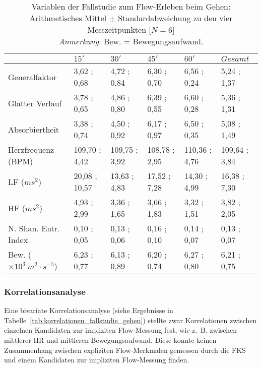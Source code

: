 \begin{sidewaystable}
\centering
	\caption[Variablen zu den vier Messzeitpunkten (Fallstudie: Gehen)]{Variablen der Fallstudie zum Flow-Erleben beim Gehen: Arithmetisches Mittel $\pm$ Standardabweichung zu den vier Messzeitpunkten [$N = 6$] \\ \hspace{\textwidth}\emph{Anmerkung}: Bew. = Bewegungsaufwand.}	
	\label{tab:variablen_nach_messzeitpunkt_fallstudie_gehen}
	\begin{tabular}{lyyyyy}
\toprule
& $15'$ & $30'$ & $45'$ & $60'$ & $Gesamt$ \\
\midrule
Generalfaktor & 3{,}62 ; 0{,}68 & 4{,}72 ; 0{,}84 & 6{,}30 ; 0{,}70 & 6{,}56 ; 0{,}24 & 5{,}24 ; 1{,}37 \\
Glatter Verlauf & 3{,}78 ; 0{,}65 & 4{,}86 ; 0{,}80 & 6{,}39 ; 0{,}55 & 6{,}60 ; 0{,}28 & 5{,}36 ; 1{,}31 \\
Absorbiertheit & 3{,}38 ; 0{,}74 & 4{,}50 ; 0{,}92 & 6{,}17 ; 0{,}97 & 6{,}50 ; 0{,}35 & 5{,}08 ; 1{,}49 \\
Herzfrequenz (BPM) & 109{,}70 ; 4{,}42 & 109{,}75 ; 3{,}92 & 108{,}78 ; 2{,}95 & 110{,}36 ; 4{,}76 & 109{,}64 ; 3{,}84 \\
LF ($ms^2$) & 20{,}08 ; 10{,}57 & 13{,}63 ; 4{,}83 & 17{,}52 ; 7{,}28 & 14{,}30 ; 4{,}99 & 16{,}38 ; 7{,}30 \\
HF ($ms^2$) & 4{,}93 ; 2{,}99 & 3{,}36 ; 1{,}65 & 3{,}66 ; 1{,}83 & 3{,}32 ; 1{,}51 & 3{,}82 ; 2{,}05 \\
N. Shan. Entr. Index & 0{,}10 ; 0{,}05 & 0{,}13 ; 0{,}06 & 0{,}16 ; 0{,}10 & 0{,}14 ; 0{,}07 & 0{,}13 ; 0{,}07 \\
Bew. ($\times 10^3 \: m^2 \cdot s^{-5}$) & 6{,}23 ; 0{,}77 & 6{,}13 ; 0{,}89 & 6{,}20 ; 0{,}74 & 6{,}27 ; 0{,}80 & 6{,}21 ; 0{,}75 \\
\bottomrule
\end{tabular}
\end{sidewaystable}

\subsubsection{Korrelationsanalyse}
\label{subs:korrelationsanalyse_1}
Eine bivariate Korrelationsanalyse (siehe Ergebnisse in Tabelle~\ref{tab:korrelationen_fallstudie_gehen}) stellte zwar Korrelationen zwischen einzelnen Kandidaten zur impliziten Flow-Messung fest, wie z.~B. zwischen mittlerer \ac{HR} und mittleren Bewegungsaufwand. Diese konnte keinen Zusammenhang zwischen expliziten Flow-Merkmalen gemessen durch die \ac{FKS} und einem Kandidaten zur impliziten Flow-Messung finden.

